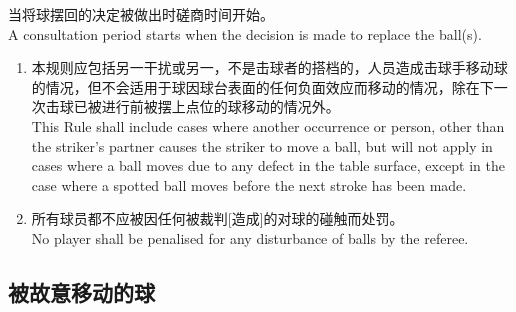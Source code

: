 \noindent 当将球摆回的决定被做出时磋商时间开始。\\
A consultation period starts when the decision is made to replace the ball(s).
\begin{enumerate}[label=(\alph*)]
    \item 本规则应包括另一干扰或另一，不是击球者的搭档的，人员造成击球手移动球的情况，但不会适用于球因球台表面的任何负面效应而移动的情况，除在下一次击球已被进行前被摆上点位的球移动的情况外。\\
    This Rule shall include cases where another occurrence or person, other than the striker's partner causes the striker to move a ball, but will not apply in cases where a ball moves due to any defect in the table surface, except in the case where a spotted ball moves before the next stroke has been made.
    \item 所有球员都不应被因任何被裁判[造成]的对球的碰触而处罚。\\
    No player shall be penalised for any disturbance of balls by the referee.
\end{enumerate}

\subsection{被故意移动的球}\label{22316}

